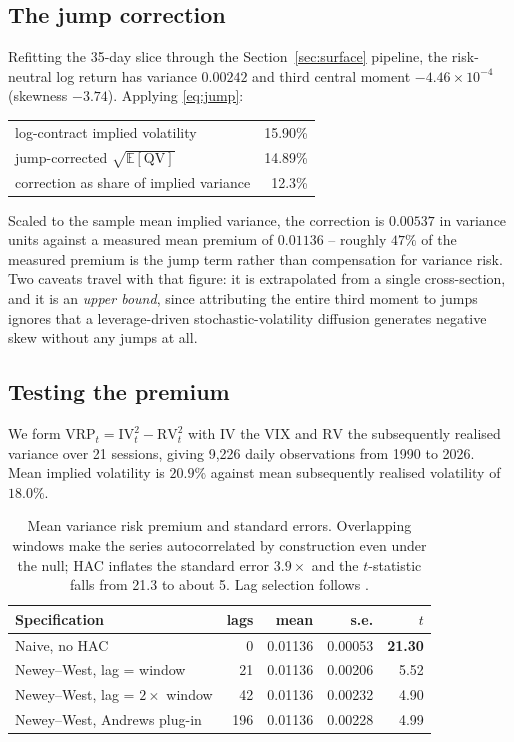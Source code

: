 \documentclass[11pt,a4paper]{article}
\theoremstyle{remark}
\newcommand{\E}{\mathbb{E}}
\newcommand{\IV}{\mathrm{IV}}
\newcommand{\RV}{\mathrm{RV}}
\newcommand{\VRP}{\mathrm{VRP}}
\begin{document}
\subsection{The jump correction}

Refitting the 35-day slice through the Section~\ref{sec:surface} pipeline, the
risk-neutral log return has variance $0.00242$ and third central moment
$-4.46\times10^{-4}$ (skewness $-3.74$). Applying \eqref{eq:jump}:

\begin{center}
\small
\begin{tabular}{lr}
\toprule
log-contract implied volatility & 15.90\% \\
jump-corrected $\sqrt{\E[\text{QV}]}$ & 14.89\% \\
correction as share of implied variance & 12.3\% \\
\bottomrule
\end{tabular}
\end{center}

Scaled to the sample mean implied variance, the correction is $0.00537$ in
variance units against a measured mean premium of $0.01136$ -- roughly $47\%$
of the measured premium is the jump term rather than compensation for variance
risk. Two caveats travel with that figure: it is extrapolated from a single
cross-section, and it is an \emph{upper bound}, since attributing the entire
third moment to jumps ignores that a leverage-driven stochastic-volatility
diffusion generates negative skew without any jumps at all.

\subsection{Testing the premium}

We form $\VRP_t = \IV_t^2 - \RV_t^2$ with $\IV$ the VIX and $\RV$ the
subsequently realised variance over 21 sessions, giving 9{,}226 daily
observations from 1990 to 2026. Mean implied volatility is $20.9\%$ against
mean subsequently realised volatility of $18.0\%$.

\begin{table}[htbp]
\centering
\small
\begin{tabular}{lrrrr}
\toprule
Specification & lags & mean & s.e. & $t$ \\
\midrule
Naive, no HAC & 0 & 0.01136 & 0.00053 & \textbf{21.30} \\
Newey--West, lag = window & 21 & 0.01136 & 0.00206 & 5.52 \\
Newey--West, lag = $2\times$ window & 42 & 0.01136 & 0.00232 & 4.90 \\
Newey--West, Andrews plug-in & 196 & 0.01136 & 0.00228 & 4.99 \\
\bottomrule
\end{tabular}
\caption{Mean variance risk premium and standard errors. Overlapping windows
make the series autocorrelated by construction even under the null; HAC
inflates the standard error $3.9\times$ and the $t$-statistic falls from 21.3 to
about 5. Lag selection follows \citet{newey1987,newey1994}.}
\label{tab:hac}
\end{table}
\end{document}
